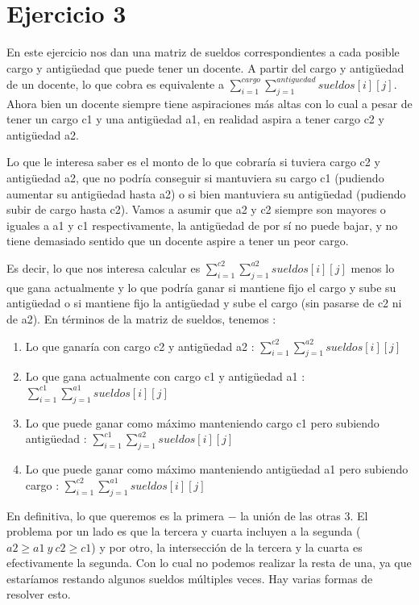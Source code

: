 \section{Ejercicio 3}

En este ejercicio nos dan una matriz de sueldos correspondientes a cada posible cargo y antigüedad que puede tener un docente. A partir del cargo y antigüedad de un docente, lo que cobra es equivalente a $\sum_{i = 1}^{cargo} \sum_{j = 1}^{antiguedad} sueldos[i][j]$. Ahora bien un docente siempre tiene aspiraciones más altas con lo cual a pesar de tener un cargo c1 y una antigüedad a1, en realidad aspira a tener cargo c2 y antigüedad a2. \newline

Lo que le interesa saber es el monto de lo que cobraría si tuviera cargo c2 y antigüedad a2, que no podría conseguir si mantuviera su cargo c1 (pudiendo aumentar su antigüedad hasta a2) o si bien mantuviera su antigüedad (pudiendo subir de cargo hasta c2). Vamos a asumir que a2 y c2 siempre son mayores o iguales a a1 y c1 respectivamente, la antigüedad de por sí no puede bajar, y no tiene demasiado sentido que un docente aspire a tener un peor cargo. \newline

Es decir, lo que nos interesa calcular es $\sum_{i = 1}^{c2} \sum_{j = 1}^{a2} sueldos[i][j]$ menos lo que gana actualmente y lo que podría ganar si mantiene fijo el cargo y sube su antigüedad o si mantiene fijo la antigüedad y sube el cargo (sin pasarse de c2 ni de a2). En términos de la matriz de sueldos, tenemos : 

\begin{enumerate}
	\item Lo que ganaría con cargo c2 y antigüedad a2 : $\sum_{i = 1}^{c2} \sum_{j = 1}^{a2} sueldos[i][j]$
	\item Lo que gana actualmente con cargo c1 y antigüedad a1 : $\sum_{i = 1}^{c1} \sum_{j = 1}^{a1} sueldos[i][j]$
	\item Lo que puede ganar como máximo manteniendo cargo c1 pero subiendo antigüedad : $\sum_{i = 1}^{c1} \sum_{j = 1}^{a2} sueldos[i][j]$
	\item Lo que puede ganar como máximo manteniendo antigüedad a1 pero subiendo cargo : $\sum_{i = 1}^{c2} \sum_{j = 1}^{a1} sueldos[i][j]$
\end{enumerate}

En definitiva, lo que queremos es la primera $-$ la unión de las otras 3. El problema por un lado es que la tercera y cuarta incluyen a la segunda ($a2 \geq a1\ y\ c2 \geq c1$) y por otro, la intersección de la tercera y la cuarta es efectivamente la segunda. Con lo cual no podemos realizar la resta de una, ya que estaríamos restando algunos sueldos múltiples veces. Hay varias formas de resolver esto. \newline

